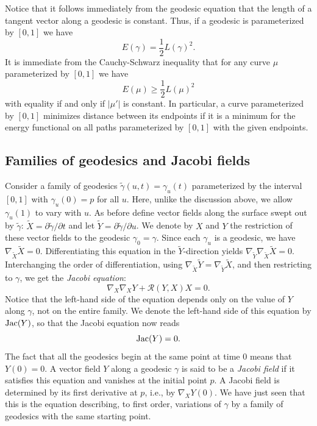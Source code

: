 Notice that it follows immediately from the geodesic equation that
the length of a tangent vector along a geodesic is constant. Thus,
if a geodesic is parameterized by $[0,1]$ we have
$$E(\gamma)=\frac{1}{2}L(\gamma)^2.$$
It is immediate from the Cauchy-Schwarz inequality that for any
curve $\mu$ parameterized by $[0,1]$ we have
$$E(\mu)\ge \frac{1}{2}L(\mu)^2$$
with equality if and only if $|\mu'|$ is constant. In particular, a
curve parameterized by $[0,1]$ minimizes distance between its
endpoints if it is a minimum for the energy functional on all paths
parameterized by $[0,1]$ with the given endpoints.






\subsection{Families of geodesics and Jacobi fields}


Consider a family of geodesics $\tilde\gamma(u,t)=\gamma_u(t)$
parameterized by the interval  $[0,1]$ with $\gamma_u(0)=p$ for all
$u$. Here, unlike the discussion above, we allow $\gamma_u(1)$ to
vary with $u$. As before define vector fields along the surface
swept out by $\tilde \gamma$:  $\widetilde X=\partial
\tilde\gamma/\partial t$ and let $\tilde
Y=\partial\tilde\gamma/\partial u$.  We denote by $X$ and $Y$ the
restriction of these vector fields to the geodesic
$\gamma_0=\gamma$.
 Since each
$\gamma_u$ is a geodesic, we have $\nabla_{\widetilde X}{\widetilde
X}=0$. Differentiating this equation in the $\widetilde Y$-direction
yields $\nabla_{\widetilde Y}\nabla_{\widetilde X}\widetilde X=0$.
Interchanging the order of differentiation, using
$\nabla_{\widetilde X}\widetilde Y=\nabla_{\widetilde Y}{\widetilde
X}$, and then restricting to $\gamma$, we get the {\em Jacobi
equation}:
$$\nabla_X\nabla_XY+{\mathcal R}(Y,X)X=0.$$
Notice that the left-hand side of the equation depends only on the
value of $Y$ along $\gamma$, not on the entire family. We denote the
left-hand side of this equation by $\operatorname{Jac}(Y)$, so that the Jacobi
equation now reads
$$\operatorname{Jac}(Y)=0.$$
 The fact that all the geodesics begin at the same point at time
$0$ means that $Y(0)=0$. A vector field $Y$ along a geodesic
$\gamma$ is said to be a {\em Jacobi field} if
it satisfies this equation and vanishes at the initial point $p$. A
Jacobi field is determined by its first derivative at $p$, i.e., by
$\nabla_XY(0)$. We have just seen that this is the equation
describing, to first order, variations of $\gamma$ by a family of
geodesics with the same starting point.

